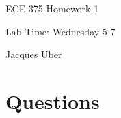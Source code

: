 \documentclass[12pt,letterpaper]{article}
\begin{document}
\begin{titlepage}
    \vspace*{4cm}
    \begin{flushright}
    {\huge
        ECE 375 Homework 1\\[1cm]
    }
    \end{flushright}
    \begin{flushleft}
    Lab Time: Wednesday 5-7
    \end{flushleft}
    \begin{flushright}
    Jacques Uber
    \vfill
    \end{flushright}

\end{titlepage}

\section{Questions}
\end{document}
